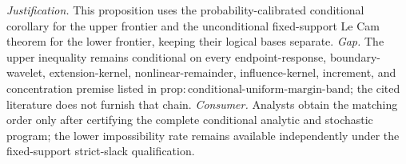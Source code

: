 \documentclass{article}
\begin{document}
\par\smallskip\noindent \textit{Justification.} This proposition uses the probability-calibrated conditional corollary for the upper frontier and the unconditional fixed-support Le Cam theorem for the lower frontier, keeping their logical bases separate. \textit{Gap.} The upper inequality remains conditional on every endpoint-response, boundary-wavelet, extension-kernel, nonlinear-remainder, influence-kernel, increment, and concentration premise listed in \(\mathrm{prop:conditional\text{-}uniform\text{-}margin\text{-}band}\); the cited literature does not furnish that chain. \textit{Consumer.} Analysts obtain the matching order only after certifying the complete conditional analytic and stochastic program; the lower impossibility rate remains available independently under the fixed-support strict-slack qualification.
\end{document}
